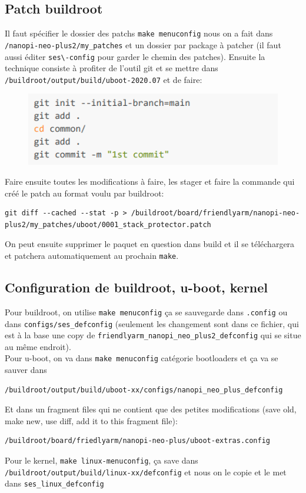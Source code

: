 \subsection{Patch buildroot}
Il faut spécifier le dossier des patchs \verb!make menuconfig! nous on a fait dans \verb!/nanopi-neo-plus2/my_patches! et un dossier par package à patcher (il faut aussi éditer \verb!ses\-config! pour garder le chemin des patches). Ensuite la technique consiste à profiter de l'outil git et se mettre dans \verb!/buildroot/output/build/uboot-2020.07! et de faire:
\begin{figure}[H]
\centering
\includegraphics[width=0.9\columnwidth]{Figures/buildroot_03.png}
\end{figure}
Faire ensuite toutes les modifications à faire, les stager et faire la commande qui créé le patch au format voulu par buildroot:
\begin{lstlisting}[style=bash]
git diff --cached --stat -p > /buildroot/board/friendlyarm/nanopi-neo-plus2/my_patches/uboot/0001_stack_protector.patch
\end{lstlisting}
On peut ensuite supprimer le paquet en question dans build et il se téléchargera et patchera automatiquement au prochain \verb!make!.
\subsection{Configuration de buildroot, u-boot, kernel}
Pour buildroot, on utilise \verb!make menuconfig! ça se sauvegarde dans \verb!.config! ou dans \verb!configs/ses_defconfig! (seulement les changement sont dans ce fichier, qui est à la base une copy de \verb!friendlyarm_nanopi_neo_plus2_defconfig! qui se situe au même endroit).\\
Pour u-boot, on va dans \verb!make menuconfig! catégorie bootloaders et ça va se sauver dans 
\begin{lstlisting}[style=bash]
/buildroot/output/build/uboot-xx/configs/nanopi_neo_plus_defconfig
\end{lstlisting}
Et dans un fragment files qui ne contient que des petites modifications (save old, make new, use diff, add it to this fragment file): 
\begin{lstlisting}[style=bash]
/buildroot/board/friedlyarm/nanopi-neo-plus/uboot-extras.config
\end{lstlisting}
Pour le kernel, \verb!make linux-menuconfig!, ça save dans \verb!/buildroot/output/build/linux-xx/defconfig! et nous on le copie et le met dans \verb!ses_linux_defconfig!
